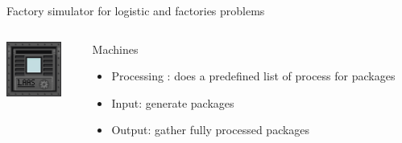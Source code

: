 \begin{frame}{Factory simulator for logistic and factories problems}
    \begin{columns}
        \begin{column}{0.2\textwidth}
            \includegraphics[width = 0.8\textwidth]{images/godot/machine_texture.png}
        \end{column}
        \begin{column}{0.7\textwidth}
            Machines
            \begin{itemize}
                \item Processing : does a predefined list of process for packages
                \item Input: generate packages
                \item Output: gather fully processed packages
            \end{itemize}

        \end{column}
    \end{columns}

    ~


\end{frame}
